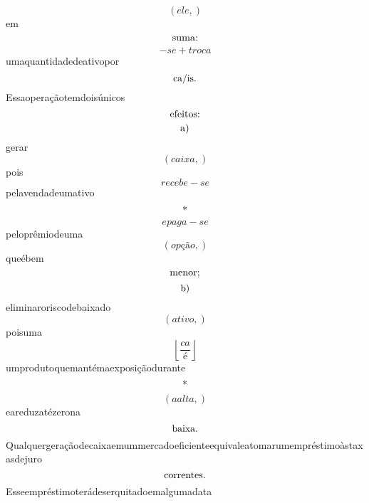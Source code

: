 \documentclass{article}
\begin{document}
\begin{equation}
\left( ele,\right)
\end{equation}em\begin{equation}
$suma:$
\end{equation}\begin{equation}
- se + troca
\end{equation}umaquantidadedeativopor\begin{equation}
$ca/is.$
\end{equation}Essaoperaçãotemdoisúnicos\begin{equation}
$efeitos:$
\end{equation}\begin{equation}
$a)$
\end{equation}gerar\begin{equation}
\left( caixa,\right)
\end{equation}pois\begin{equation}
recebe - se
\end{equation}pelavendadeumativo\begin{equation}
$*$
\end{equation}\begin{equation}
epaga - se
\end{equation}peloprêmiodeuma\begin{equation}
\left( opção,\right)
\end{equation}queébem\begin{equation}
$menor;$
\end{equation}\begin{equation}
$b)$
\end{equation}eliminaroriscodebaixado\begin{equation}
\left( ativo,\right)
\end{equation}poisuma\begin{equation}
\left\lfloor{\frac{ca}{é}}\right\rfloor
\end{equation}umprodutoquemantémaexposiçãodurante\begin{equation}
$*$
\end{equation}\begin{equation}
\left( aalta,\right)
\end{equation}eareduzatézerona\begin{equation}
$baixa.$
\end{equation}Qualquergeraçãodecaixaemummercadoeficienteequivaleatomarumempréstimoàstaxasdejuro\begin{equation}
$correntes.$
\end{equation}Esseempréstimoterádeserquitadoemalgumadata\begin{equation}

\end{equation}
\end{document}
